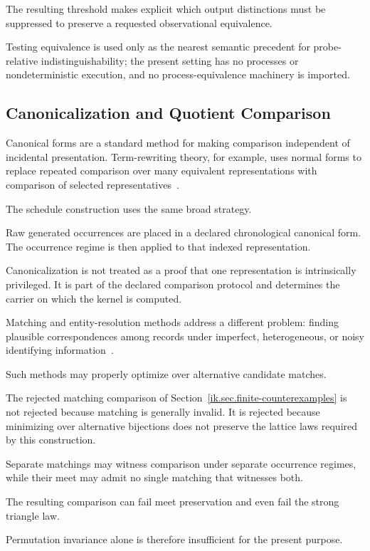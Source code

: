 \documentclass[11pt]{article}
\theoremstyle{plain}
\theoremstyle{definition}
\theoremstyle{remark}
\begin{document}
The resulting threshold makes explicit which output distinctions
must be suppressed to preserve a requested observational equivalence.

Testing equivalence is used only as the nearest semantic precedent
for probe-relative indistinguishability;
the present setting has no processes or nondeterministic execution,
and no process-equivalence machinery is imported.

\subsection{Canonicalization and Quotient Comparison}

Canonical forms
are a standard method
for making comparison independent
of incidental presentation.
Term-rewriting theory,
for example,
uses normal forms
to replace repeated comparison
over many equivalent representations
with comparison of selected representatives~\citep{baadernipkow1998}.

The schedule construction uses
the same broad strategy.

Raw generated occurrences
are placed in a declared
chronological canonical form.
The occurrence regime
is then applied
to that indexed representation.

Canonicalization is not treated
as a proof that
one representation is intrinsically privileged.
It is part of the declared comparison protocol
and determines the carrier
on which the kernel is computed.

Matching and entity-resolution methods
address a different problem:
finding plausible correspondences
among records
under imperfect,
heterogeneous,
or noisy identifying information~\citep{christen2012datamatching}.

Such methods may properly optimize
over alternative candidate matches.

The rejected matching comparison
of Section~\ref{ik.sec.finite-counterexamples}
is not rejected
because matching is generally invalid.
It is rejected
because minimizing over alternative bijections
does not preserve
the lattice laws required
by this construction.

Separate matchings may witness
comparison under separate occurrence regimes,
while their meet may admit
no single matching
that witnesses both.

The resulting comparison
can fail meet preservation
and even fail
the strong triangle law.

Permutation invariance alone
is therefore insufficient
for the present purpose.
\end{document}
